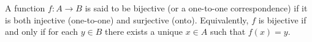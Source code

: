 A function $f: A \to B$ is said to be bijective (or a one-to-one correspondence) if it is both injective (one-to-one) and surjective (onto). Equivalently, $f$ is bijective if and only if for each $y \in B$ there exists a unique $x \in A$ such that $f(x) = y$.
